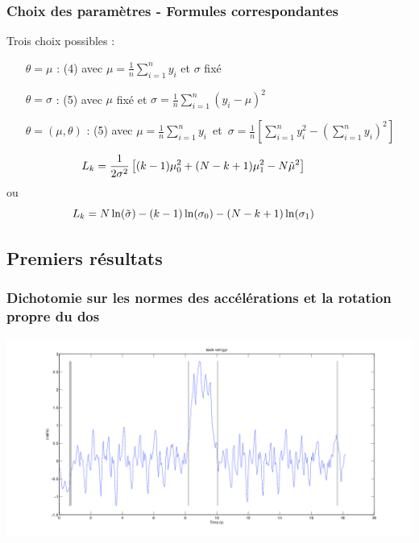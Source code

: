 \documentclass{beamer}
\begin{document}
\begin{frame}
	\frametitle{Choix des paramètres - Formules correspondantes}
	Trois choix possibles :
	\vspace*{.3cm}
	\begin{itemize}
		\item[$\theta=\mu$]: (4) avec $\mu=\frac1n\sum_{i=1}^ny_i$ et $\sigma$ fixé
		\vspace*{.2cm}
		\item[$\theta=\sigma$]:  (5) avec $\mu$ fixé et $\sigma=\frac1n\sum_{i=1}^n(y_i-\mu)^2$
		\vspace*{.2cm}
		\item[$\theta=(\mu,\theta)$]: (5) avec \mbox{$\mu=\frac1n\sum_{i=1}^ny_i$ et $\sigma=\frac1n\left[\sum_{i=1}^ny_i^2-(\sum_{i=1}^ny_i)^2\right]$}
	\end{itemize}
	\vspace*{0.8cm}
	\begin{equation}
	\hspace{-1cm}	L_k=\frac 1{2\sigma^2}\left[(k-1)\mu_0^2+(N-k+1)\mu_1^2-N\tilde\mu^2\right]
	\end{equation}
	ou
	\begin{equation}
	\hspace{-1cm}	L_k=N\ln(\tilde\sigma)-(k-1)\ln(\sigma_0)-(N-k+1)\ln(\sigma_1)
	\end{equation}
\end{frame}

\subsection{Premiers résultats}

\begin{frame}
	\frametitle{Dichotomie sur les normes des accélérations et la rotation propre du dos}
	\hspace*{-2.8cm}\includegraphics[scale=0.4]{examplecusumbackvertgyr}
\end{frame}
\end{document}
